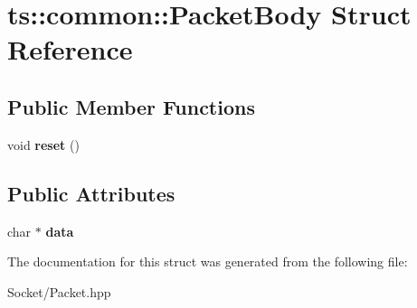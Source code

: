 \hypertarget{structts_1_1common_1_1_packet_body}{}\section{ts\+:\+:common\+:\+:Packet\+Body Struct Reference}
\label{structts_1_1common_1_1_packet_body}
\subsection*{Public Member Functions}
\begin{DoxyCompactItemize}
\item 
\mbox{\label{structts_1_1common_1_1_packet_body_a2a7de4788181d825b0187aabe71354ec}} 
void {\bfseries reset} ()
\end{DoxyCompactItemize}
\subsection*{Public Attributes}
\begin{DoxyCompactItemize}
\item 
\mbox{\label{structts_1_1common_1_1_packet_body_ac209e31fb1a4d1024061a4949d923ff0}} 
char $\ast$ {\bfseries data}
\end{DoxyCompactItemize}


The documentation for this struct was generated from the following file\+:\begin{DoxyCompactItemize}
\item 
Socket/Packet.\+hpp\end{DoxyCompactItemize}
